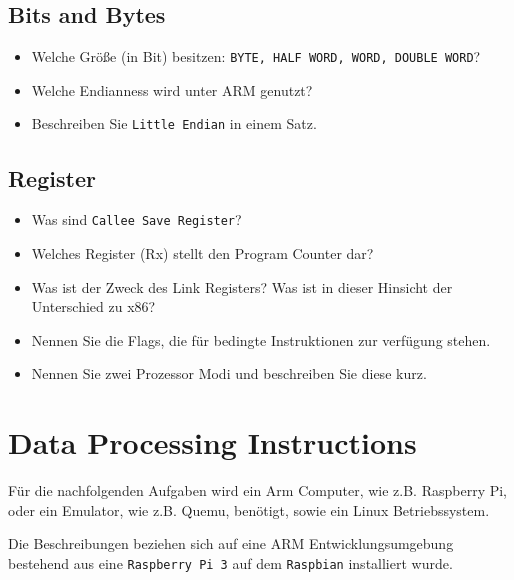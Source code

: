 \documentclass[12pt]{article}
\begin{document}
\subsection{Bits and Bytes}

\begin{itemize}
    \item Welche Größe (in Bit) besitzen: \texttt{BYTE, HALF WORD, WORD, DOUBLE WORD}?
    \item Welche Endianness wird unter ARM genutzt?
    \item Beschreiben Sie \texttt{Little Endian} in einem Satz.
\end{itemize}

\subsection{Register}

\begin{itemize}
    \item Was sind \texttt{Callee Save Register}?
    \item Welches Register (Rx) stellt den Program Counter dar?
    \item Was ist der Zweck des Link Registers? Was ist in dieser Hinsicht der
        Unterschied zu x86?
    \item Nennen Sie die Flags, die für bedingte Instruktionen zur verfügung stehen.
    \item Nennen Sie zwei Prozessor Modi und beschreiben Sie diese kurz.
\end{itemize}

\section{Data Processing Instructions}
Für die nachfolgenden Aufgaben wird ein Arm Computer, wie z.B. Raspberry Pi,
oder ein Emulator, wie z.B. Quemu, benötigt, sowie ein Linux Betriebssystem.

Die Beschreibungen beziehen sich auf eine ARM Entwicklungsumgebung
bestehend aus eine \texttt{Raspberry Pi 3} auf dem \texttt{Raspbian} installiert
wurde.
\end{document}
